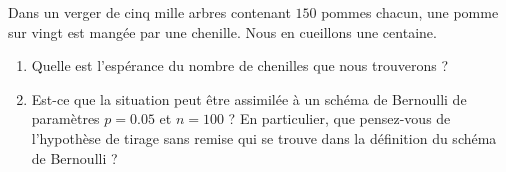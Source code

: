 
\begin{exercice}\label{exoPremiere-0082}

    Dans un verger de cinq mille arbres contenant \( 150\) pommes chacun, une pomme sur vingt est mangée par une chenille. Nous en cueillons une centaine.
    \begin{enumerate}
        \item
            Quelle est l'espérance du nombre de chenilles que nous trouverons ?
        \item
            Est-ce que la situation peut être assimilée à un schéma de Bernoulli de paramètres \( p=0.05\) et \( n=100\) ? En particulier, que pensez-vous de l'hypothèse de tirage sans remise qui se trouve dans la définition du schéma de Bernoulli ?
    \end{enumerate}

\end{exercice}
